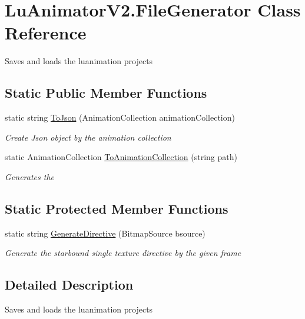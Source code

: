 \hypertarget{class_lu_animator_v2_1_1_file_generator}{}\section{Lu\+Animator\+V2.\+File\+Generator Class Reference}
\label{class_lu_animator_v2_1_1_file_generator}


Saves and loads the luanimation projects  


\subsection*{Static Public Member Functions}
\begin{DoxyCompactItemize}
\item 
static string \hyperlink{class_lu_animator_v2_1_1_file_generator_abffd6182cb6ba1f037209693b2639466}{To\+Json} (Animation\+Collection animation\+Collection)
\begin{DoxyCompactList}\small\item\em Create Json object by the animation collection \end{DoxyCompactList}\item 
static Animation\+Collection \hyperlink{class_lu_animator_v2_1_1_file_generator_a1b842faa7436ec1b4238429c7340764f}{To\+Animation\+Collection} (string path)
\begin{DoxyCompactList}\small\item\em Generates the \end{DoxyCompactList}\end{DoxyCompactItemize}
\subsection*{Static Protected Member Functions}
\begin{DoxyCompactItemize}
\item 
static string \hyperlink{class_lu_animator_v2_1_1_file_generator_a2a6e42c8ff1f6d09f9caa6dd8e325c08}{Generate\+Directive} (Bitmap\+Source bsource)
\begin{DoxyCompactList}\small\item\em Generate the starbound single texture directive by the given frame \end{DoxyCompactList}\end{DoxyCompactItemize}


\subsection{Detailed Description}
Saves and loads the luanimation projects 



